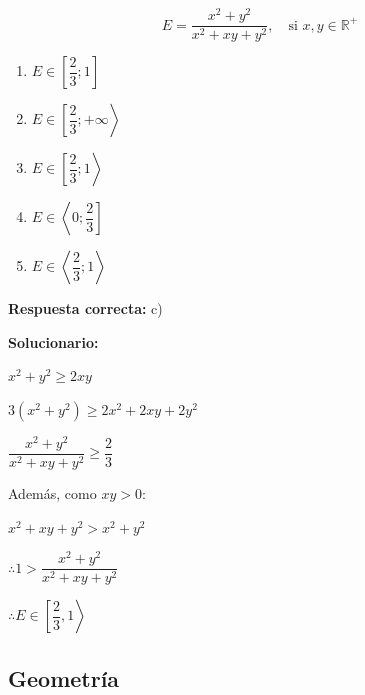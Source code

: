\begin{enumerate}[resume]
	$$E=\dfrac{x^2+y^2}{x^2+xy+y^2}, \quad \text{si } x,y\in \mathbb{R}^{+}$$
	
	\begin{enumerate}[label=\alph*)]
		\item $E\in \left[\dfrac{2}{3};1\right]$
		\item $E\in \left[\dfrac{2}{3};+\infty\right\rangle$
		\item $E\in \left[\dfrac{2}{3};1\right\rangle$
		\item $E\in \left\langle 0;\dfrac{2}{3}\right]$
		\item $E\in \left\langle \dfrac{2}{3};1\right\rangle$
	\end{enumerate}
	\textbf{Respuesta correcta:} c)
	
	\vspace{2mm}
	\textbf{Solucionario:}
	
	$x^2+y^2\geq 2xy$
	
	$3(x^2+y^2)\geq 2x^2+2xy+2y^2$
	
	$\dfrac{x^2+y^2}{x^2+xy+y^2}\geq \dfrac{2}{3}$
	
	Además, como $xy>0$:
	
	$x^2+xy+y^2>x^2+y^2$
	
	$\therefore 1>\dfrac{x^2+y^2}{x^2+xy+y^2}$
	
	$\therefore E\in \left[\dfrac{2}{3},1\right\rangle$
	
	\fbox{$E\in \left[\dfrac{2}{3},1\right\rangle$}
	
	\vspace{6mm}
	
\end{enumerate}





\subsection*{Geometría}

